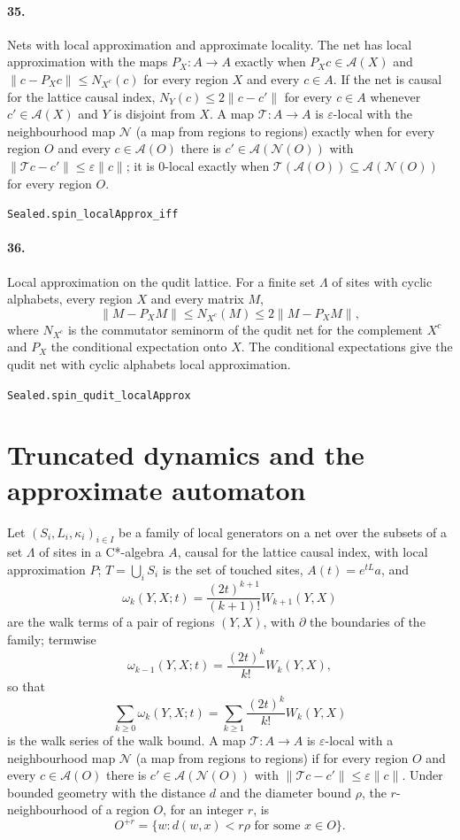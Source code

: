 \documentclass[11pt]{article}
\begin{document}
\paragraph{35.} Nets with local approximation and approximate locality. The net has local approximation with the maps $P_X : A \to A$ exactly when $P_X c \in \mathcal A(X)$ and $\|c - P_X c\| \le N_{X^c}(c)$ for every region $X$ and every $c \in A$. If the net is causal for the lattice causal index, $N_Y(c) \le 2\|c - c'\|$ for every $c \in A$ whenever $c' \in \mathcal A(X)$ and $Y$ is disjoint from $X$. A map $\mathcal T : A \to A$ is $\varepsilon$-local with the neighbourhood map $\mathcal N$ (a map from regions to regions) exactly when for every region $O$ and every $c \in \mathcal A(O)$ there is $c' \in \mathcal A(\mathcal N(O))$ with $\|\mathcal T c - c'\| \le \varepsilon \|c\|$; it is $0$-local exactly when $\mathcal T(\mathcal A(O)) \subseteq \mathcal A(\mathcal N(O))$ for every region $O$.\par{\footnotesize\texttt{Sealed.spin\_localApprox\_iff}}

\paragraph{36.} Local approximation on the qudit lattice. For a finite set $\Lambda$ of sites with cyclic alphabets, every region $X$ and every matrix $M$, \[\|M - P_X M\| \le N_{X^c}(M) \le 2 \|M - P_X M\|,\] where $N_{X^c}$ is the commutator seminorm of the qudit net for the complement $X^c$ and $P_X$ the conditional expectation onto $X$. The conditional expectations give the qudit net with cyclic alphabets local approximation.\par{\footnotesize\texttt{Sealed.spin\_qudit\_localApprox}}

\section*{Truncated dynamics and the approximate automaton}
Let $(S_i, L_i, \kappa_i)_{i \in I}$ be a family of local generators on a net over the subsets of a set $\Lambda$ of sites in a C*-algebra $A$, causal for the lattice causal index, with local approximation $P$; $T = \bigcup_i S_i$ is the set of touched sites, $A(t) = e^{tL} a$, and \[\omega_k(Y, X; t) = \frac{(2t)^{k+1}}{(k+1)!} W_{k+1}(Y, X)\] are the walk terms of a pair of regions $(Y, X)$, with $\partial$ the boundaries of the family; termwise \[\omega_{k-1}(Y, X; t) = \frac{(2t)^k}{k!} W_k(Y, X),\] so that \[\sum_{k \ge 0} \omega_k(Y, X; t) = \sum_{k \ge 1} \frac{(2t)^k}{k!} W_k(Y, X)\] is the walk series of the walk bound. A map $\mathcal T : A \to A$ is $\varepsilon$-local with a neighbourhood map $\mathcal N$ (a map from regions to regions) if for every region $O$ and every $c \in \mathcal A(O)$ there is $c' \in \mathcal A(\mathcal N(O))$ with $\|\mathcal T c - c'\| \le \varepsilon \|c\|$. Under bounded geometry with the distance $d$ and the diameter bound $\rho$, the $r$-neighbourhood of a region $O$, for an integer $r$, is \[O^{+r} = \{w : d(w, x) < r\rho \text{ for some } x \in O\}.\]
\end{document}
